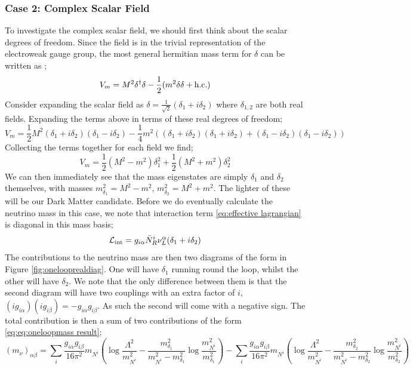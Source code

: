 \documentclass[10pt]{article}
\begin{document}
\subsubsection{Case 2: Complex Scalar Field}
To investigate the complex scalar field, we should first think about the scalar degrees of freedom. Since the field is in the trivial representation of the electroweak gauge group, the most general hermitian mass term for $\delta$ can be written as \cite{Farzan2010};
\begin{equation}
  V_m = M^2 \delta^{\dagger} \delta - \frac{1}{2}(m^2 \delta\delta + \text{h.c.})
\end{equation}
Consider expanding the scalar field as $\delta = \tfrac{1}{\sqrt{2}}(\delta_1 + i\delta_2)$ where $\delta_{1,2}$ are both real fields. Expanding the terms above in terms of these real degrees of freedom;
\begin{dmath}
  V_m = \frac{1}{2}M^2(\delta_1 + i\delta_2)(\delta_1 - i\delta_2) - \frac{1}{4}m^2\left((\delta_1 + i\delta_2)(\delta_1 + i\delta_2) + (\delta_1 - i\delta_2)(\delta_1 - i\delta_2)\right)
\end{dmath}
Collecting the terms together for each field we find;
\begin{equation}
  V_m = \frac{1}{2}(M^2 - m^2)\delta_1^2 + \frac{1}{2}(M^2 + m^2)\delta_2^2
\end{equation}
We can then immediately see that the mass eigenstates are simply $\delta_1$ and $\delta_2$ themselves, with masses $m^2_{\delta_1} = M^2 - m^2$, $m^2_{\delta_2} = M^2 + m^2$. The lighter of these will be our Dark Matter candidate. Before we do eventually calculate the neutrino mass in this case, we note that interaction term \eqref{eq:effective lagrangian} is diagonal in this mass basis;
\begin{equation}
  \mathcal{L}_{\text{int}} = g_{i\alpha}\bar{N}^i_R \nu^\alpha_L (\delta_1 + i \delta_2)
\end{equation}
The contributions to the neutrino mass are then two diagrams of the form in Figure \ref{fig:onelooprealdiag}. One will have $\delta_1$ running round the loop, whilst the other will have $\delta_2$. We note that the only difference between them is that the second diagram will have two couplings with an extra factor of $i$, $(ig_{i\alpha})(ig_{i\beta}) = -g_{i\alpha}g_{i\beta}$. As such the second will come with a negative sign. The total contribution is then a sum of two contributions of the form \eqref{eq:eq:oneloopmass result};
\begin{dmath}
  (m_\nu)_{\alpha\beta} = \sum_{i}{\frac{g_{i\alpha}g_{i\beta}}{16\pi^2}m_{N^i}\left(\log\frac{\Lambda^2}{m_{N^i}^2} - \frac{m_{\delta_1}^2}{m_{N^i}^2 - m_{\delta_1}^2}\log\frac{m_{N^i}^2}{m_{\delta_1}^2}\right)} - \sum_{i}{\frac{g_{i\alpha}g_{i\beta}}{16\pi^2}m_{N^i}\left(\log\frac{\Lambda^2}{m_{N^i}^2} - \frac{m_{\delta_2}^2}{m_{N^i}^2 - m_{\delta_2}^2}\log\frac{m_{N^i}^2}{m_{\delta_2}^2}\right)}
\end{dmath}
\end{document}
